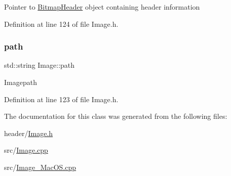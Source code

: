 Pointer to \mbox{\hyperlink{classBitmapHeader}{Bitmap\+Header}} object containing header information 

Definition at line 124 of file Image.\+h.

\mbox{\label{classImage_aec8a33f176362d146da8c058798ebbff}} 
\subsubsection{\texorpdfstring{path}{path}}
{\footnotesize\ttfamily std\+::string Image\+::path\hspace{0.3cm}{\ttfamily [protected]}}

Imagepath 

Definition at line 123 of file Image.\+h.



The documentation for this class was generated from the following files\+:\begin{DoxyCompactItemize}
\item 
header/\mbox{\hyperlink{Image_8h}{Image.\+h}}\item 
src/\mbox{\hyperlink{Image_8cpp}{Image.\+cpp}}\item 
src/\mbox{\hyperlink{Image__MacOS_8cpp}{Image\+\_\+\+Mac\+O\+S.\+cpp}}\end{DoxyCompactItemize}
